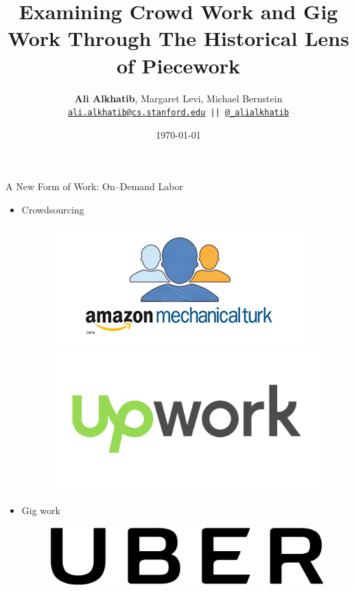 \documentclass{beamer}
\title{Examining Crowd Work and Gig Work Through The Historical Lens of Piecework}
\author{\textbf{Ali Alkhatib}, Margaret Levi, Michael Bernstein\\
\texttt{ \href{mailto:ali.alkhatib@cs.stanford.edu}{ali.alkhatib@cs.stanford.edu} ||
         \href{http://twitter.com/_alialkhatib}{@\_alialkhatib} }}
\institute[Stanford]{Stanford University}
\date{\today}
\begin{document}
\begin{frame}
\titlepage
\end{frame}


\begin{frame}{A New Form of Work: On--Demand Labor}
  \begin{itemize}[<+- | alert@+>]
    \item Crowdsourcing
    \begin{figure}
    \includegraphics[scale=0.3]{figures/amt.png}
    \includegraphics[scale=0.1]{figures/upwork.png}
    \end{figure}
    \item Gig work
    \begin{figure}
    \includegraphics[scale=0.1]{figures/uber.png}~~~~~

\end{figure}
\end{itemize}
\end{frame}
\end{document}

